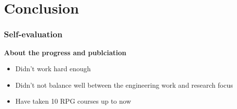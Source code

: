 \documentclass{beamer}
\begin{document}
\section{Conclusion}
\begin{frame}[t]
\frametitle{Self-evaluation}

\textbf{About the progress and publciation}
\begin{itemize}
\item Didn't work hard enough
\item Didn't not balance well between the engineering work and research focus
\item Have taken 10 RPG courses up to now
\end{itemize}

\end{frame}

\end{document}
